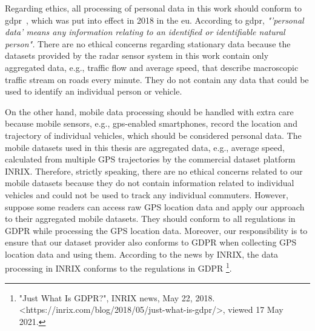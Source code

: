 \documentclass[english]{kththesis}
\begin{document}
Regarding ethics, all processing of personal data in this work should conform to \gls{gdpr}~\cite{eu_gdpr}, which was put into effect in 2018 in the \gls{eu}. According to \gls{gdpr}, \textit{"'personal data' means any information relating to an identified or identifiable natural person".} There are no ethical concerns regarding stationary data because the datasets provided by the radar sensor system in this work contain only aggregated data, e.g., traffic flow and average speed, that describe macroscopic traffic stream on roads every minute. They do not contain any data that could be used to identify an individual person or vehicle.

On the other hand, mobile data processing should be handled with extra care because mobile sensors, e.g., \gls{gps}-enabled smartphones, record the location and trajectory of individual vehicles, which should be considered personal data. The mobile datasets used in this thesis are aggregated data, e.g., average speed, calculated from multiple GPS trajectories by the commercial dataset platform INRIX. Therefore, strictly speaking, there are no ethical concerns related to our mobile datasets because they do not contain information related to individual vehicles and could not be used to track any individual commuters. However, suppose some readers can access raw GPS location data and apply our approach to their aggregated mobile datasets. They should conform to all regulations in GDPR while processing the GPS location data. Moreover, our responsibility is to ensure that our dataset provider also conforms to GDPR when collecting GPS location data and using them. According to the news by INRIX, the data processing in INRIX conforms to the regulations in GDPR \footnote{"Just What Is GDPR?", INRIX news, May 22, 2018. <https://inrix.com/blog/2018/05/just-what-is-gdpr/>, viewed 17 May 2021.}.
\end{document}
